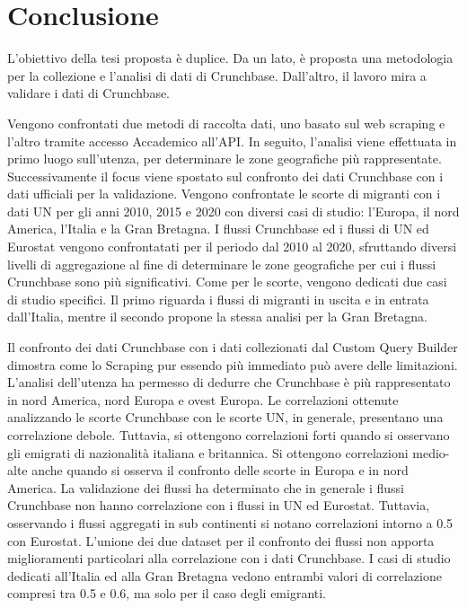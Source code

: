 \chapter{Conclusione}
\label{conclusione}
L'obiettivo della tesi proposta è duplice. Da un lato, è proposta una metodologia per la collezione e l'analisi di dati di Crunchbase. Dall'altro, il lavoro mira a validare i dati di Crunchbase.

Vengono confrontati due metodi di raccolta dati, uno basato sul web scraping e l'altro tramite accesso Accademico all'API. In seguito, l'analisi viene effettuata in primo luogo sull'utenza, per determinare le zone geografiche più rappresentate. Successivamente il focus viene spostato sul confronto dei dati Crunchbase con i dati ufficiali per la validazione. 
Vengono confrontate le scorte di migranti con i dati UN per gli anni 2010, 2015 e 2020 con diversi casi di studio: l'Europa, il nord America, l'Italia e la Gran Bretagna. I flussi Crunchbase ed i flussi di UN ed Eurostat vengono confrontatati per il periodo dal 2010 al 2020, sfruttando diversi livelli di aggregazione al fine di determinare le zone geografiche per cui i flussi Crunchbase sono più significativi. Come per le scorte, vengono dedicati due casi di studio specifici. Il primo riguarda i flussi di migranti in uscita e in entrata dall'Italia, mentre il secondo propone la stessa analisi per la Gran Bretagna. 

Il confronto dei dati Crunchbase con i dati collezionati dal Custom Query Builder dimostra come lo Scraping pur essendo più immediato può avere delle limitazioni.
L'analisi dell'utenza ha permesso di dedurre che Crunchbase è più rappresentato in nord America,  nord Europa e ovest Europa. 
Le correlazioni ottenute analizzando le scorte Crunchbase con le scorte UN, in generale, presentano una correlazione debole. Tuttavia, si ottengono correlazioni forti quando si osservano gli emigrati di nazionalità italiana e britannica. Si ottengono correlazioni medio-alte anche quando si osserva il confronto delle scorte in Europa e in nord America.
La validazione dei flussi ha determinato che in  generale i flussi Crunchbase non hanno correlazione con i flussi in UN ed Eurostat. Tuttavia, osservando i flussi aggregati in sub continenti si notano correlazioni intorno a 0.5 con Eurostat. L'unione dei due dataset per il confronto dei flussi non apporta miglioramenti particolari alla correlazione con i dati Crunchbase. I casi di studio dedicati all'Italia ed alla Gran Bretagna vedono entrambi valori di correlazione compresi tra 0.5 e 0.6, ma solo per il caso degli emigranti. 

